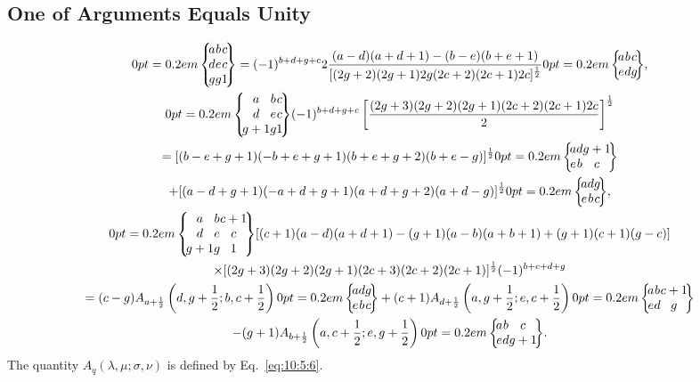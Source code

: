 \subsection{One of Arguments Equals Unity \cite{ref032}}\label{sec:10.9.2}
\begin{gather}
\ninej{a}{b}{c}{d}{e}{c}{g}{g}{1}=(-1)^{b+d+g+c} 2 \frac{(a-d)(a+d+1)-(b-e)(b+e+1)}{[(2 g+2)(2 g+1) 2 g(2 c+2)(2 c+1) 2 c]^{\frac{1}{2}}}\sixj{a}{b}{c}{e}{d}{g},  \label{eq:10:9:6}\\
\ninej{a}{b}{c}{d}{e}{c}{g+1}{g}{1}(-1)^{b+d+g+c}\left[\frac{(2 g+3)(2 g+2)(2 g+1)(2 c+2)(2 c+1) 2 c}{2}\right]^{\frac{1}{2}}  \notag\\
=[(b-e+g+1)(-b+e+g+1)(b+e+g+2)(b+e-g)]^{\frac{1}{2}}\sixj{a}{d}{g+1}{e}{b}{c}  \notag\\
+[(a-d+g+1)(-a+d+g+1)(a+d+g+2)(a+d-g)]^{\frac{1}{2}}\sixj{a}{d}{g}{e}{b}{c},  \label{eq:10:9:7}\\
\ninej{a}{b}{c+1}{d}{e}{c}{g+1}{g}{1}[(c+1)(a-d)(a+d+1)-(g+1)(a-b)(a+b+1)+(g+1)(c+1)(g-c)]  \notag\\
\times [(2g+3)(2g+2)(2g+1)(2c+3)(2c+2)(2c+1)]^{\frac12}(-1)^{b+c+d+g} \notag\\
=(c-g) A_{a+\frac{1}{2}}\left(d, g+\frac{1}{2} ; b, c+\frac{1}{2}\right)\sixj{a}{d}{g}{e}{b}{c}+(c+1) A_{d+\frac{1}{2}}\left(a, g+\frac{1}{2} ; e, c+\frac{1}{2}\right)\sixj{a}{b}{c+1}{e}{d}{g}  \notag\\
-(g+1) A_{b+\frac{1}{2}}\left(a, c+\frac{1}{2} ; e, g+\frac{1}{2}\right)\sixj{a}{b}{c}{e}{d}{g+1} . \label{eq:10:9:8}
\end{gather}
The quantity $A_{q}(\lambda, \mu ; \sigma, \nu)$ is defined by Eq.~\eqref{eq:10:5:6}.

